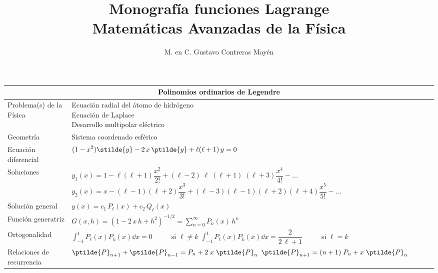 
\title{Monografía funciones Lagrange \\ \large {Matemáticas Avanzadas de la Física} \vspace{-3ex}}
\author{M. en C. Gustavo Contreras Mayén}
\date{ }

\maketitle
\fontsize{14}{14}\selectfont
\renewcommand\arraystretch{2}
\vspace*{-3cm}
\begin{table}[H]
    \centering
\begin{tabular}{| p{5cm} | p{12cm} |} \hline
\multicolumn{2}{|c|}{\textbf{Polinomios ordinarios de Legendre}} \\ \hline
Problema(s) de la Física & \makecell[l]{Ecuación radial del átomo de hidrógeno \\ Ecuación de Laplace \\ Desarrollo multipolar eléctrico} \\ \hline
Geometría & Sistema coordenado esférico \\ \hline
Ecuación diferencial & \(\displaystyle
(1 - x^{2}) \stilde{y} - 2 \, x \, \ptilde{y} + \ell (\ell + 1) \, y = 0
\) \\ \hline
Soluciones & \makecell[l]{\( y_{1}(x) = 1 - \ell (\ell + 1) \dfrac{x^{2}}{2!} + (\ell - 2)\; \ell \; (\ell + 1)\;(\ell + 3) \dfrac{x^{4}}{4!} - \ldots \) \\ \( y_{2}(x) = x - (\ell - 1)(\ell + 2) \dfrac{x^{3}}{3!} + (\ell - 3) (\ell - 1)(\ell + 2)(\ell + 4) \dfrac{x^{5}}{5!} - \ldots \)}\\ \hline
Solución general & \( \displaystyle y(x) = c_{1} \, P_{\ell}(x) + c_{2} \, Q_{\ell} (x)  \)\\ \hline
Función generatriz & \(\displaystyle G(x ,h) = (1 - 2 \, x \, h + h^{2})^{-1/2} =  \sum_{n=0}^{\infty} P_{n}(x) \, h^{n} \) \\ \hline
Ortogonalidad & \makecell[l]{ \( \displaystyle \int_{-1}^{1} P_{\ell}(x) P_{k}(x) \dd{x} = 0 \hspace{1cm} \mbox{ si $\ell \neq k$} \) \\
\( \displaystyle \int_{-1}^{1} P_{\ell}(x) P_{k}(x) \dd{x} = \dfrac{2}{2 \, \ell + 1} \hspace{1cm} \mbox{ si $\ell = k$} \) } \\ \hline
Relaciones de recurrencia & \makecell[l]{ \( \displaystyle \ptilde{P}_{n+1} + \ptilde{P}_{n-1} =  P_{n} + 2 \; x \; \ptilde{P}_{n} \) \\ \( \displaystyle \ptilde{P}_{n+1} = (n+1) \; P_{n} + x \; \ptilde{P}_{n}\) \\
}
\end{tabular}
\end{table}

